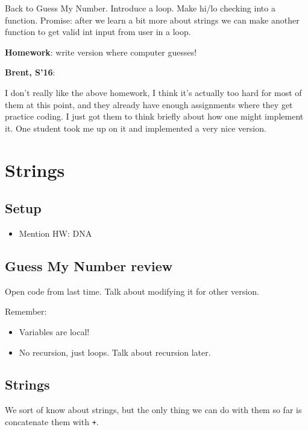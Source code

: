 \documentclass{article}
\newenvironment{reflect}[1]
{
  \noindent
  \begin{lrbox}{\reflectbox}
    \begin{minipage}[t]{\textwidth}
      \textbf{#1}:
}{
    \end{minipage}
  \end{lrbox}
  \fbox{\usebox{\reflectbox}}
}
\begin{document}
Back to Guess My Number.  Introduce a loop.  Make hi/lo checking into
a function.  Promise: after we learn a bit more about strings we can
make another function to get valid int input from user in a loop.

\textbf{Homework}: write version where computer guesses!

\begin{reflect}{Brent, S'16}
  I don't really like the above homework, I think it's actually too
  hard for most of them at this point, and they already have enough
  assignments where they get practice coding.  I just got them to
  think briefly about how one might implement it.  One student took me
  up on it and implemented a very nice version.
\end{reflect}

\newpage
\section{Strings}

\subsection*{Setup}
\begin{itemize}
\item Mention HW: DNA
\end{itemize}

\subsection*{Guess My Number review}

Open code from last time.  Talk about modifying it for other version.

Remember:
\begin{itemize}
\item Variables are local!
\item No recursion, just loops.  Talk about recursion later.
\end{itemize}

\subsection*{Strings}

We sort of know about strings, but the only thing we can do with them
so far is concatenate them with \verb|+|.
\end{document}
